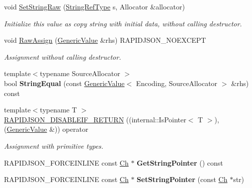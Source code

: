 \begin{DoxyCompactItemize}
void \hyperlink{classGenericValue_ad3d91db36dfdbfc1af40a79aae07723c}{Set\+String\+Raw} (\hyperlink{classGenericValue_a32e0f30ee278072374c8168b14d3317f}{String\+Ref\+Type} s, Allocator \&allocator)
\begin{DoxyCompactList}\small\item\em Initialize this value as copy string with initial data, without calling destructor. \end{DoxyCompactList}\item 
\mbox{\label{classGenericValue_abb8ea2dfbe74ff4ee7dac6be31317f81}} 
void \hyperlink{classGenericValue_abb8ea2dfbe74ff4ee7dac6be31317f81}{Raw\+Assign} (\hyperlink{classGenericValue}{Generic\+Value} \&rhs) R\+A\+P\+I\+D\+J\+S\+O\+N\+\_\+\+N\+O\+E\+X\+C\+E\+PT
\begin{DoxyCompactList}\small\item\em Assignment without calling destructor. \end{DoxyCompactList}\item 
\mbox{\label{classGenericValue_ad4d088dc601d99fea9d16300a7ec7ee1}} 
{\footnotesize template$<$typename Source\+Allocator $>$ }\\bool {\bfseries String\+Equal} (const \hyperlink{classGenericValue}{Generic\+Value}$<$ Encoding, Source\+Allocator $>$ \&rhs) const
\item 
{\footnotesize template$<$typename T $>$ }\\\hyperlink{classGenericValue_a4a4418a93777942e1fb7ea71f8aaf680}{R\+A\+P\+I\+D\+J\+S\+O\+N\+\_\+\+D\+I\+S\+A\+B\+L\+E\+I\+F\+\_\+\+R\+E\+T\+U\+RN} ((internal\+::\+Is\+Pointer$<$ T $>$),(\hyperlink{classGenericValue}{Generic\+Value} \&)) operator
\begin{DoxyCompactList}\small\item\em Assignment with primitive types. \end{DoxyCompactList}\item 
\mbox{\label{classGenericValue_a0f54466a07c496300b15987e1b1915f8}} 
R\+A\+P\+I\+D\+J\+S\+O\+N\+\_\+\+F\+O\+R\+C\+E\+I\+N\+L\+I\+NE const \hyperlink{classGenericValue_ade0e0ce64ccd5d852da57a35e720bafb}{Ch} $\ast$ {\bfseries Get\+String\+Pointer} () const
\item 
\mbox{\label{classGenericValue_aa3d65011422b4aba50bf035b21a522e1}} 
R\+A\+P\+I\+D\+J\+S\+O\+N\+\_\+\+F\+O\+R\+C\+E\+I\+N\+L\+I\+NE const \hyperlink{classGenericValue_ade0e0ce64ccd5d852da57a35e720bafb}{Ch} $\ast$ {\bfseries Set\+String\+Pointer} (const \hyperlink{classGenericValue_ade0e0ce64ccd5d852da57a35e720bafb}{Ch} $\ast$str)

\end{DoxyCompactItemize}
